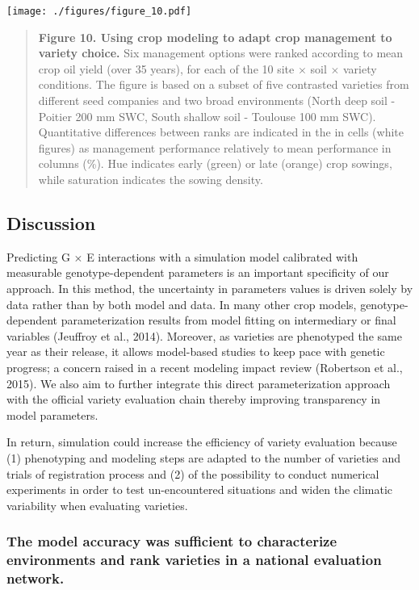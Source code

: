 \documentclass[a4paper]{article}
\begin{document}
\texttt{[image: ./figures/figure\_10.pdf]}

\begin{quote}
\textbf{Figure 10. Using crop modeling to adapt crop management to
variety choice.} Six management options were ranked according to mean
crop oil yield (over 35 years), for each of the 10 site \(\times\) soil
\(\times\) variety conditions. The figure is based on a subset of five
contrasted varieties from different seed companies and two broad
environments (North deep soil - Poitier 200 mm SWC, South shallow soil -
Toulouse 100 mm SWC). Quantitative differences between ranks are
indicated in the in cells (white figures) as management performance
relatively to mean performance in columns (\%). Hue indicates early
(green) or late (orange) crop sowings, while saturation indicates the
sowing density.
\end{quote}

\subsection{Discussion}\label{discussion}

Predicting G \(\times\) E interactions with a simulation model
calibrated with measurable genotype-dependent parameters is an important
specificity of our approach. In this method, the uncertainty in
parameters values is driven solely by data rather than by both model and
data. In many other crop models, genotype-dependent parameterization
results from model fitting on intermediary or final variables (Jeuffroy
et al., 2014). Moreover, as varieties are phenotyped the same year as
their release, it allows model-based studies to keep pace with genetic
progress; a concern raised in a recent modeling impact review (Robertson
et al., 2015). We also aim to further integrate this direct
parameterization approach with the official variety evaluation chain
thereby improving transparency in model parameters.

In return, simulation could increase the efficiency of variety
evaluation because (1) phenotyping and modeling steps are adapted to the
number of varieties and trials of registration process and (2) of the
possibility to conduct numerical experiments in order to test
un-encountered situations and widen the climatic variability when
evaluating varieties.

\subsubsection{The model accuracy was sufficient to characterize
environments and rank varieties in a national evaluation
network.}\label{the-model-accuracy-was-sufficient-to-characterize-environments-and-rank-varieties-in-a-national-evaluation-network.}
\end{document}
